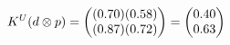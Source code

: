 \documentclass[preview]{standalone}
\begin{document}
\begin{align*}
\special{dvisvgm:raw <g id='unique000'>}K^U(d \otimes p) = \begin{pmatrix} (0.70)(0.58) \\ (0.87)(0.72) \end{pmatrix} = \begin{pmatrix} 0.40 \\ 0.63 \end{pmatrix}\special{dvisvgm:raw </g>}
\end{align*}
\end{document}
